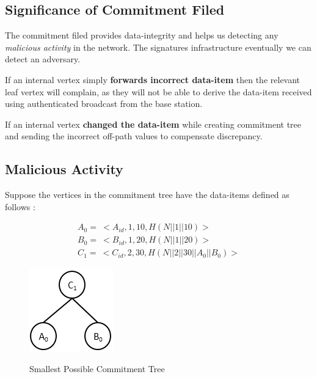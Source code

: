 \documentclass[%
  slidesonly,%
  semlayer%
  ]{seminar}                                  %
\begin{document}
\begin{slide}
      \subsection*{Significance of Commitment Filed}

        The commitment filed provides data-integrity and helps us detecting any \textit{malicious activity} in the network. 
        The signatures infrastructure eventually we can detect an adversary. 

        If an internal vertex simply \textbf{forwards incorrect data-item} then the relevant leaf vertex will complain, as they will not be able to derive the data-item received using authenticated broadcast from the base station.
        
        If an internal vertex \textbf{changed the data-item} while creating commitment tree and sending the incorrect off-path values to compensate discrepancy. 
        \vfill
        \clearpage

      \subsection*{Malicious Activity}

        Suppose the vertices in the commitment tree have the data-items defined as follows :
        
        \begin{equation*}
          \begin{array}{l}
            A_{0} =\ <A_{id},1,10, H(N||1||10)>\\
            B_{0} =\ <B_{id},1,20, H(N||1||20)>\\
            C_{1} =\ <C_{id},2,30, H(N||2||30||A_{0}||B_{0})>
          \end{array}
        \end{equation*}

        \begin{figure}
          \centering
          \includegraphics[scale=0.6]{images/commitment-tree-2.png}
          \label{fig:smallest-ct}
          \tiny{\caption{Smallest Possible Commitment Tree}}
        \end{figure}
        \vfill
        \clearpage


\end{slide}
\end{document}
